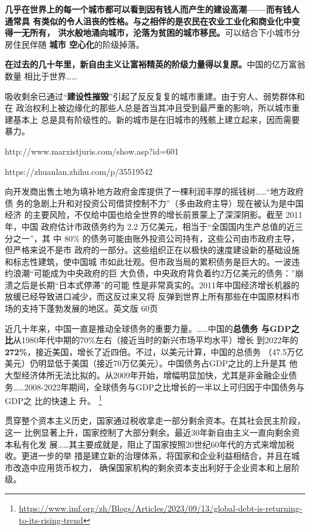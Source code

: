 \textbf{几乎在世界上的每一个城市都可以看到因有钱人而产生的建设高潮——而有钱人通常具
有类似的令人沮丧的性格。与之相伴的是农民在农业工业化和商业化中变得一无所有，
洪水般地涌向城市，沦落为贫困的城市移民。}可以结合下小城市分房住民伴随 \textbf{城市
空心化}的阶级掉落。

\textbf{在过去的几十年里，新自由主义让富裕精英的阶级力量得以复原。}中国的亿万富翁数量
相比于世界……

吸收剩余已通过“\textbf{建设性摧毁}”引起了反反复复的城市重建。由于穷人、弱势群体和在
政治权利上被边缘化的那些人总是首当其冲且受到最严重的影响，所以城市重建基本上
总是具有阶级性的。新的城市是在旧城市的残骸上建立起来，因而需要暴力。

http://www.marxistjuris.com/show.asp?id=601

https://zhuanlan.zhihu.com/p/35519542

向开发商出售土地为填补地方政府金库提供了一棵利润丰厚的摇钱树……“地方政府债
务的急剧上升和对投资公司借贷控制不力”（多由政府主导）现在被认为是中国经济
的主要风险，不仅给中国也给全世界的增长前景蒙上了深深阴影。截至 2011 年，中国
政府估计市政债务约为 2.2 万亿美元，相当于“全国国内生产总值的近三分之一”，其
中 80\% 的债务可能由账外投资公司持有，这些公司由市政府主导，但严格来说不是市
政府的一部分。这些组织正在以极快的速度建设新的基础设施和标志性建筑，使中国城
市如此壮观。但市政当局的累积债务是巨大的。一波违约浪潮“可能成为中央政府的巨
大负债，中央政府背负着约2万亿美元的债务：”崩溃之后是长期“日本式停滞”的可能
性是非常真实的。2011年中国经济增长机器的放缓已经导致进口减少，而这反过来又将
反弹到世界上所有那些在中国原材料市场的支持下蓬勃发展的地区。英文版 60页




近几十年来，中国一直是推动全球债务的重要力量。……中国的\textbf{总债务
  与GDP之比}从1980年代中期的70\%左右（接近当时的新兴市场平均水平）增长
到2022年的\textbf{272\%}，接近美国，增长了近四倍。不过，以美元计算，中国的总债务
（47.5万亿美元）仍明显低于美国（接近70万亿美元）。中国债务占GDP之比的上升是其
他大型经济体所无法比拟的。从2009年开始，增幅明显加快，尤其是非金融企业债
务……2008-2022年期间，全球债务与GDP之比增长的一半以上可归因于中国债务与GDP之
比的快速上
升。
\footnote{\url{https://www.imf.org/zh/Blogs/Articles/2023/09/13/global-debt-is-returning-to-its-rising-trend}}

贯穿整个资本主义历史，国家通过税收拿走一部分剩余资本。在其社会民主阶段，这一
比例显著上升，国家控制了大部分剩余。最近30年新自由主义一直向剩余资本私有化发
展……其主要成就是，阻止了国家按照20世纪60年代的方式来增加税收。更进一步的举
措是建立新的治理体系，将国家和企业利益相结合，并且在城市改造中应用货币权力，
确保国家机构的剩余资本支出利好于企业资本和上层阶级。



